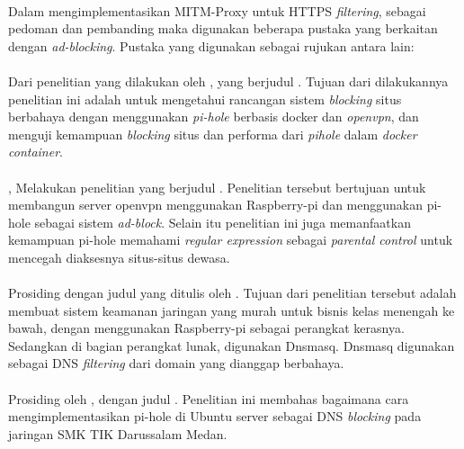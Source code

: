 \documentclass[../PROPOSAL_PRA_SKRIPSI_ALDZIKRI_DWIJAYANTO_PRATHAMA.tex]{subfiles}
\begin{document}
  \paragraph*{}Dalam mengimplementasikan MITM-Proxy untuk
  HTTPS \textit{filtering}, sebagai pedoman dan pembanding
  maka digunakan beberapa pustaka yang berkaitan dengan
  \textit{ad-blocking}. Pustaka yang digunakan sebagai
  rujukan antara lain:

  \paragraph*{} Dari penelitian yang dilakukan oleh
  \cite{uni2021}, yang berjudul .
  Tujuan dari dilakukannya penelitian ini adalah untuk
  mengetahui rancangan sistem \textit{blocking} situs
  berbahaya dengan menggunakan \textit{pi-hole} berbasis
  docker dan \textit{openvpn}, dan menguji kemampuan
  \textit{blocking} situs dan performa dari \textit{pihole}
  dalam \textit{docker container}.

  \paragraph*{} \cite{yusoff2020}, Melakukan penelitian yang
  berjudul \textit{}. Penelitian
  tersebut bertujuan untuk membangun server openvpn
  menggunakan Raspberry-pi dan menggunakan pi-hole sebagai
  sistem \textit{ad-block}. Selain itu penelitian ini juga
  memanfaatkan kemampuan pi-hole memahami \textit{regular
  expression} sebagai \textit{parental control} untuk
  mencegah diaksesnya situs-situs dewasa.

  \paragraph*{} Prosiding dengan judul
  \textit{}yang ditulis oleh
  \cite{sarath2020}. Tujuan dari penelitian tersebut adalah
  membuat sistem keamanan jaringan yang murah untuk bisnis
  kelas menengah ke bawah, dengan menggunakan Raspberry-pi
  sebagai perangkat kerasnya. Sedangkan di bagian perangkat
  lunak, digunakan Dnsmasq. Dnsmasq digunakan sebagai DNS
  \textit{filtering} dari domain yang dianggap berbahaya.

  \paragraph*{} Prosiding oleh \cite{wahyudi2020}, dengan
  judul . Penelitian ini membahas
  bagaimana cara mengimplementasikan pi-hole di Ubuntu
  server sebagai DNS \textit{blocking} pada jaringan SMK TIK
  Darussalam Medan.
\end{document}
